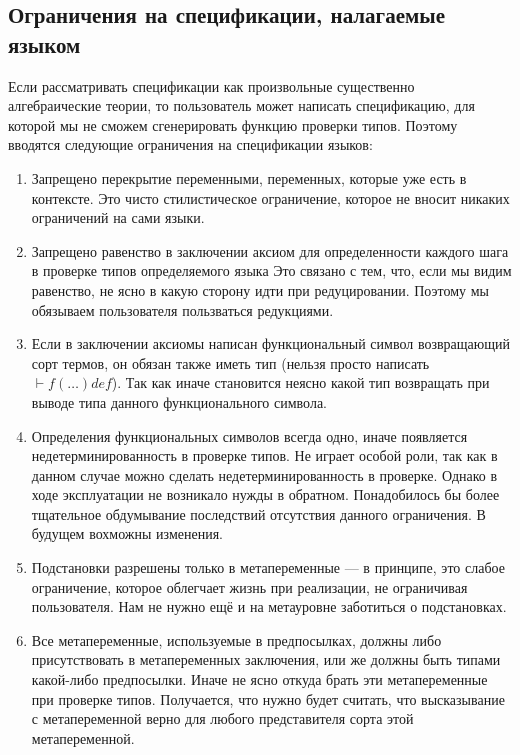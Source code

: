\subsection{Ограничения на спецификации, налагаемые языком}\label{constraints}
Если рассматривать спецификации как произвольные существенно алгебраические теории, то пользователь может написать спецификацию, для которой мы не сможем сгенерировать функцию проверки типов. Поэтому вводятся следующие ограничения на спецификации языков:

\begin{enumerate}
\item Запрещено перекрытие переменными, переменных, которые уже есть в контексте. Это чисто стилистическое ограничение, которое не вносит никаких ограничений на сами языки.

\item Запрещено равенство в заключении аксиом для определенности каждого шага в проверке типов определяемого языка Это связано с тем, что, если мы видим равенство, не ясно в какую сторону идти при редуцировании. Поэтому мы обязываем пользователя пользваться редукциями.

\item Если в заключении аксиомы написан функциональный символ возвращающий сорт термов, он обязан также иметь тип (нельзя просто написать $ \vdash f(\ldots) def$). Так как иначе становится неясно какой тип возвращать при выводе типа данного функционального символа.

\item Определения функциональных символов всегда одно, иначе появляется недетерминированность в проверке типов. Не играет особой роли, так как в данном случае можно сделать недетерминированность в проверке. Однако в ходе эксплуатации не возникало нужды в обратном. Понадобилось бы более тщательное обдумывание последствий отсутствия данного ограничения. В будущем вохможны изменения.

\item Подстановки разрешены только в метапеременные --- в принципе, это слабое ограничение, которое облегчает жизнь при реализации, не ограничивая пользователя. Нам не нужно ещё и на метауровне заботиться о подстановках.

\item \label{tm:Meta} Все метапеременные, используемые в предпосылках, должны либо присутствовать в метапеременных заключения, или же должны быть типами какой-либо предпосылки. Иначе не ясно откуда брать эти метапеременные при проверке типов. Получается, что нужно будет считать, что высказывание с метапеременной верно для любого представителя сорта этой метапеременной.


\end{enumerate}
